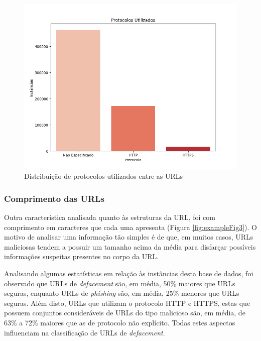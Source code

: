 \documentclass[a4paper, 12pt]{article}
\begin{document}
\begin{figure}[H]
    \centering
    \includegraphics[width=1\textwidth]{Images/Figure_2.png}
    \caption{Distribuição de protocolos utilizados entre as URLs}
    \label{fig:exampleFig2}
\end{figure}

\subsubsection{Comprimento das URLs}

Outra característica analisada quanto às estruturas da URL, foi com comprimento em caracteres que cada uma apresenta (Figura \ref{fig:exampleFig3}). O motivo de analisar uma informação tão simples é de que, em muitos casos, URLs maliciosas tendem a possuir um tamanho acima da média para disfarçar possíveis informações suspeitas presentes no corpo da URL.

Analisando algumas estatísticas em relação às instâncias desta base de dados, foi observado que URLs de \emph{defacement} são, em média, 50\% maiores que URLs seguras, enquanto URLs de \emph{phishing} são, em média, 25\% menores que URLs seguras. Além disto, URLs que utilizam o protocolo HTTP e HTTPS, estas que possuem conjuntos consideráveis de URLs do tipo malicioso são, em média, de 63\% a 72\% maiores que as de protocolo não explícito. Todas estes aspectos influenciam na classificação de URLs de \emph{defacement}.
\end{document}
